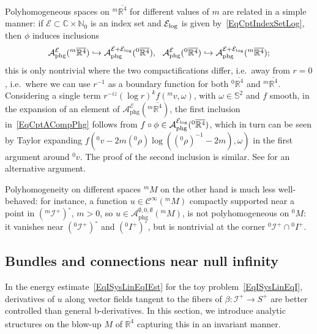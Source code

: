 \documentclass[reqno,11pt,letterpaper]{amsart}
\numberwithin{equation}{section}
\numberwithin{figure}{section}
\theoremstyle{definition}
\theoremstyle{remark}
\newcommand{\mc}{\mathcal}
\newcommand{\cA}{\mc A}
\newcommand{\cC}{\mc C}
\newcommand{\cE}{\mc E}
\newcommand{\ms}{\mathscr}
\newcommand{\scri}{\ms I}
\newcommand{\C}{\mathbb{C}}
\newcommand{\N}{\mathbb{N}}
\newcommand{\R}{\mathbb{R}}
\newcommand{\Sph}{\mathbb{S}}
\newcommand{\hra}{\hookrightarrow}
\newcommand{\ol}{\overline}
\newcommand{\CI}{\cC^\infty}
\newcommand{\phg}{{\mathrm{phg}}}
\begin{document}
Polyhomogeneous spaces on ${}^m\ol{\R^4}$ for different values of $m$ are related in a simple manner: if $\cE\subset\C\times\N_0$ is an index set and $\cE_{\rm log}$ is given by~\eqref{EqCptIndexSetLog}, then $\phi$ induces inclusions
\begin{equation}
\label{EqCptACompPhg}
  \cA_\phg^\cE({}^m\ol{\R^4}) \hra \cA_\phg^{\cE+\cE_{\rm log}}({}^0\ol{\R^4}),\ \ 
  \cA_\phg^\cE({}^0\ol{\R^4}) \hra \cA_\phg^{\cE+\cE_{\rm log}}({}^m\ol{\R^4});
\end{equation}
this is only nontrivial where the two compactifications differ, i.e.\ away from $r=0$, i.e.\ where we can use $r^{-1}$ as a boundary function for both ${}^0\ol{\R^4}$ and ${}^m\ol{\R^4}$. Considering a single term $r^{-i z}(\log r)^k f({}^m v,\omega)$, with $\omega\in\Sph^2$ and $f$ smooth, in the expansion of an element of $\cA_\phg^\cE({}^m\ol{\R^4})$, the first inclusion in~\eqref{EqCptACompPhg} follows from $f\circ\phi\in\cA_\phg^{\cE_{\rm log}}({}^0\ol{\R^4})$, which in turn can be seen by Taylor expanding $f({}^0 v-2 m({}^0\rho)\log(({}^0\rho)^{-1}-2 m),\omega)$ in the first argument around ${}^0 v$. The proof of the second inclusion is similar. See \cite[Proposition~7.8]{BaskinVasyWunschRadMink2} for an alternative argument.

Polyhomogeneity on different spaces ${}^m\!M$ on the other hand is much less well-behaved: for instance, a function $u\in\CI({}^m\!M)$ compactly supported near a point in $({}^m\!\scri^+)^\circ$, $m>0$, so $u\in\cA_\phg^{\emptyset,0,\emptyset}({}^m\!M)$, is not polyhomogeneous on ${}^0\!M$: it vanishes near $({}^0\!\scri^+)^\circ$ and $({}^0 I^+)^\circ$, but is nontrivial at the corner ${}^0\!\scri^+\cap {}^0 I^+$.



\subsection{Bundles and connections near null infinity}
\label{SsCptScri}

In the energy estimate~\eqref{EqISysLinEqIEst} for the toy problem~\eqref{EqISysLinEqI}, derivatives of $u$ along vector fields tangent to the fibers of $\beta\colon\scri^+\to S^+$ are better controlled than general b-derivatives. In this section, we introduce analytic structures on the blow-up $M$ of $\ol{\R^4}$ capturing this in an invariant manner.
\end{document}
